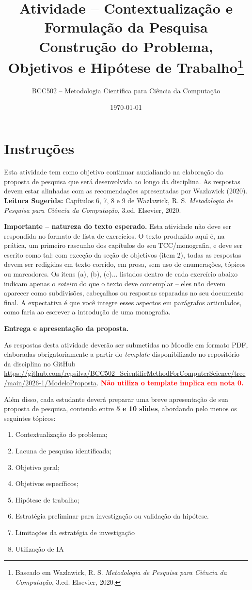 \documentclass[10pt,a4paper]{extarticle}
\title{Atividade -- Contextualização e Formulação da Pesquisa\\
\large Construção do Problema, Objetivos e Hipótese de Trabalho\footnote{Baseado em Wazlawick, R. S. \textit{Metodologia de Pesquisa para Ciência da Computação}, 3.ed. Elsevier, 2020.}}
\author{BCC502 -- Metodologia Científica para Ciência da Computação}
\date{\today}
\newcommand{\impt}[1]{\textcolor{important}{#1}}
\newcommand{\ntc}[1]{\textcolor{notice}{#1}}
\begin{document}
\maketitle

\section*{Instruções}

Esta atividade tem como objetivo continuar auxialiando na elaboração da proposta de pesquisa que será desenvolvida ao longo da disciplina. As respostas devem estar alinhadas com as recomendações apresentadas por Wazlawick (2020). \textbf{Leitura Sugerida:} Capítulos 6, 7, 8 e 9 de Wazlawick, R. S. \textit{Metodologia de Pesquisa para Ciência da Computação}, 3.ed. Elsevier, 2020.

\ntc{\textbf{Importante -- natureza do texto esperado.}} Esta atividade não deve ser respondida no formato de lista de exercícios. O texto produzido aqui é, na prática, um primeiro rascunho dos capítulos do seu TCC/monografia, e deve ser escrito como tal: \impt{com exceção da seção de objetivos (item 2), todas as respostas devem ser redigidas em texto corrido, em prosa, sem uso de enumerações, tópicos ou marcadores}. Os itens (a), (b), (c)... listados dentro de cada exercício abaixo indicam apenas o \emph{roteiro} do que o texto deve contemplar -- eles não devem aparecer como subdivisões, cabeçalhos ou respostas separadas no seu documento final. A expectativa é que você integre esses aspectos em parágrafos articulados, como faria ao escrever a introdução de uma monografia.

\textbf{Entrega e apresentação da proposta.}

As respostas desta atividade deverão ser submetidas no Moodle em formato PDF, elaboradas obrigatoriamente a partir do \textit{template} disponibilizado no repositório da disciplina no GitHub \url{https://github.com/rcpsilva/BCC502_ScientificMethodForComputerScience/tree/main/2026-1/ModeloProposta}. \textcolor{red}{\textbf{Não utiliza o template implica em nota 0.}}

Além disso, cada estudante deverá preparar uma breve apresentação de sua proposta de pesquisa, contendo entre \textbf{5 e 10 slides}, abordando pelo menos os seguintes tópicos:

\begin{enumerate}[label=(\alph*)]
    \item Contextualização do problema;
    \item Lacuna de pesquisa identificada;
    \item Objetivo geral;
    \item Objetivos específicos;
    \item Hipótese de trabalho;
    \item Estratégia preliminar para investigação ou validação da hipótese.
    \item Limitações da estratégia de investigação
    \item Utilização de IA
\end{enumerate}
\end{document}
